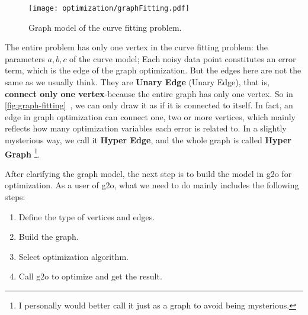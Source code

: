 \begin{figure}[!ht]
    \centering
    \texttt{[image: optimization/graphFitting.pdf]}
    \caption{Graph model of the curve fitting problem. }
    \label{fig:graph-fitting}
\end{figure}

The entire problem has only one vertex in the curve fitting problem: the parameters $a, b, c$ of the curve model; Each noisy data point constitutes an error term, which is the edge of the graph optimization. But the edges here are not the same as we usually think. They are \textbf{Unary Edge} (Unary Edge), that is, \textbf{connect only one vertex}-because the entire graph has only one vertex. So in \autoref{fig:graph-fitting}~, we can only draw it as if it is connected to itself. In fact, an edge in graph optimization can connect one, two or more vertices, which mainly reflects how many optimization variables each error is related to. In a slightly mysterious way, we call it \textbf{Hyper Edge}, and the whole graph is called \textbf{Hyper Graph} \footnote{I personally would better call it just as a graph to avoid being mysterious. }.

After clarifying the graph model, the next step is to build the model in g2o for optimization. As a user of g2o, what we need to do mainly includes the following steps:
\begin{enumerate}
    \item Define the type of vertices and edges.
    \item Build the graph.
    \item Select optimization algorithm.
    \item Call g2o to optimize and get the result.
\end{enumerate}

